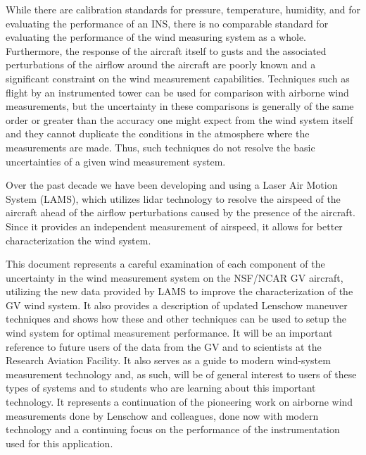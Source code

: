 \documentclass[12pt,twoside,english]{article}\usepackage[]{graphicx}\usepackage[]{color}
\begin{document}
While there are calibration standards for pressure, temperature,
humidity, and for evaluating the performance of an INS, there is no
comparable standard for evaluating the performance of the wind
measuring system as a whole. Furthermore, the response of the
aircraft itself to gusts and the associated perturbations of the
airflow around the aircraft are poorly known and a significant
constraint on the wind measurement capabilities. Techniques such as
flight by an instrumented tower can be used for comparison with
airborne wind measurements, but the uncertainty in these comparisons is
generally of the same order or greater than the accuracy one might
expect from the wind system itself and they cannot duplicate the
conditions in the atmosphere where the measurements are made. Thus,
such techniques do not resolve the basic uncertainties of a given wind
measurement system. 

Over the past decade we have been developing and using a Laser Air
Motion System (LAMS), which utilizes lidar technology to resolve the
airspeed of the aircraft ahead of the airflow perturbations caused by
the presence of the aircraft. Since it provides an independent
measurement of airspeed, it allows for better characterization the wind
system. 

This document represents a careful examination of each component of the
uncertainty in the wind measurement system on the NSF/NCAR GV aircraft,
utilizing the new data provided by LAMS to improve the characterization
of the GV wind system. It also provides a description of updated
Lenschow maneuver techniques and shows how these and other techniques
can be used to setup the wind system for optimal measurement
performance. It will be an important reference to future users of
the data from the GV and to scientists at the Research Aviation
Facility. It also serves as a guide to modern wind-system
measurement technology and, as such, will be of general interest to
users of these types of systems and to students who are learning about
this important technology. It represents a continuation of the
pioneering work on airborne wind measurements done by Lenschow and
colleagues, done now with modern technology and a continuing focus on
the performance of the instrumentation used for this application. 

\tableofcontents{}
\clearpage
{}
{}
\listoffigures
\clearpage
{}
{}
\listoftables
\cleardoublepage
\newpage
{}
\end{document}
